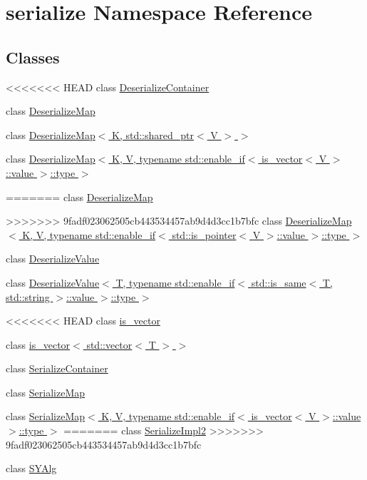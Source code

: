 \hypertarget{namespaceserialize}{}\section{serialize Namespace Reference}
\label{namespaceserialize}
\subsection*{Classes}
\begin{DoxyCompactItemize}
\item 
<<<<<<< HEAD
class \hyperlink{classserialize_1_1_deserialize_container}{Deserialize\+Container}
\item 
class \hyperlink{classserialize_1_1_deserialize_map}{Deserialize\+Map}
\item 
class \hyperlink{classserialize_1_1_deserialize_map_3_01_k_00_01std_1_1shared__ptr_3_01_v_01_4_01_4}{Deserialize\+Map$<$ K, std\+::shared\+\_\+ptr$<$ V $>$ $>$}
\item 
class \hyperlink{classserialize_1_1_deserialize_map_3_01_k_00_01_v_00_01typename_01std_1_1enable__if_3_01is__vected2d1ee1f8886a5a92a6dbc69e18bdcd}{Deserialize\+Map$<$ K, V, typename std\+::enable\+\_\+if$<$ is\+\_\+vector$<$ V $>$\+::value $>$\+::type $>$}
\item 
=======
class \hyperlink{classserialize_1_1_deserialize_map}{Deserialize\+Map}
\item 
>>>>>>> 9fadf023062505cb443534457ab9d4d3cc1b7bfc
class \hyperlink{classserialize_1_1_deserialize_map_3_01_k_00_01_v_00_01typename_01std_1_1enable__if_3_01std_1_1ibe6cfa8a2d341f3a0942baedd95196d5}{Deserialize\+Map$<$ K, V, typename std\+::enable\+\_\+if$<$ std\+::is\+\_\+pointer$<$ V $>$\+::value $>$\+::type $>$}
\item 
class \hyperlink{classserialize_1_1_deserialize_value}{Deserialize\+Value}
\item 
class \hyperlink{classserialize_1_1_deserialize_value_3_01_t_00_01typename_01std_1_1enable__if_3_01std_1_1is__sambc4bb2b40dcc8b30285e8bdc35bf8b03}{Deserialize\+Value$<$ T, typename std\+::enable\+\_\+if$<$ std\+::is\+\_\+same$<$ T, std\+::string $>$\+::value $>$\+::type $>$}
\item 
<<<<<<< HEAD
class \hyperlink{classserialize_1_1is__vector}{is\+\_\+vector}
\item 
class \hyperlink{classserialize_1_1is__vector_3_01std_1_1vector_3_01_t_01_4_01_4}{is\+\_\+vector$<$ std\+::vector$<$ T $>$ $>$}
\item 
class \hyperlink{classserialize_1_1_serialize_container}{Serialize\+Container}
\item 
class \hyperlink{classserialize_1_1_serialize_map}{Serialize\+Map}
\item 
class \hyperlink{classserialize_1_1_serialize_map_3_01_k_00_01_v_00_01typename_01std_1_1enable__if_3_01is__vector3a4a5c31f236854fe1872e17684001d1}{Serialize\+Map$<$ K, V, typename std\+::enable\+\_\+if$<$ is\+\_\+vector$<$ V $>$\+::value $>$\+::type $>$}
=======
class \hyperlink{classserialize_1_1_serialize_impl2}{Serialize\+Impl2}
>>>>>>> 9fadf023062505cb443534457ab9d4d3cc1b7bfc
\item 
class \hyperlink{classserialize_1_1_s_y_alg}{S\+Y\+Alg}
\end{DoxyCompactItemize}
